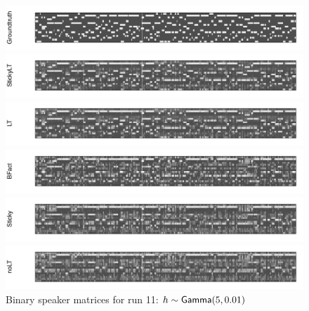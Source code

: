 \begin{figure}[tb]
\begin{center}
  \centerline{\includegraphics[width = \textwidth, height = 0.2\textwidth]{fig/cocktail/synth_s16_m12/hyper_h/h10.0_nocs_cp0/a5b0p01/groundtruth.pdf}}
  \centerline{\includegraphics[width = \textwidth, height = 0.2\textwidth]{fig/cocktail/synth_s16_m12/hyper_h/h10.0_nocs_cp0/a5b0p01/StickyLT_hdp_hmm_w0_ah5_bh0p01/binary_state.pdf}}
  \centerline{\includegraphics[width = \textwidth, height = 0.2\textwidth]{fig/cocktail/synth_s16_m12/hyper_h/h10.0_nocs_cp0/a5b0p01/LT_hdp_hmm_w0_ah5_bh0p01/binary_state.pdf}}
  \centerline{\includegraphics[width = \textwidth, height = 0.2\textwidth]{fig/cocktail/synth_s16_m12/hyper_h/h10.0_nocs_cp0/a5b0p01/BFact_hmm_w0_ah5_bh0p01/binary_state.pdf}}
  \centerline{\includegraphics[width = \textwidth, height = 0.2\textwidth]{fig/cocktail/synth_s16_m12/hyper_h/h10.0_nocs_cp0/a5b0p01/Sticky_hdp_hmm_w0_ah5_bh0p01/binary_state.pdf}}
  \centerline{\includegraphics[width = \textwidth, height = 0.2\textwidth]{fig/cocktail/synth_s16_m12/hyper_h/h10.0_nocs_cp0/a5b0p01/noLT_hdp_hmm_w0_ah5_bh0p01/binary_state.pdf}}
\caption{Binary speaker matrices for run 11: $h \sim \mathsf{Gamma}(5,0.01)$}
\end{center}
\end{figure}

